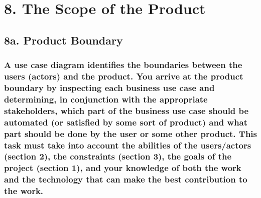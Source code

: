 \documentclass[
]{article}
\begin{document}
\hypertarget{the-scope-of-the-product}{%
\section{8. The Scope of the Product}\label{the-scope-of-the-product}}

\hypertarget{a.-product-boundary}{%
\subsection{8a. Product Boundary}\label{a.-product-boundary}}

\hypertarget{a-use-case-diagram-identifies-the-boundaries-between-the-users-actors-and-the-product.-you-arrive-at-the-product-boundary-by-inspecting-each-business-use-case-and-determining-in-conjunction-with-the-appropriate-stakeholders-which-part-of-the-business-use-case-should-be-automated-or-satisfied-by-some-sort-of-product-and-what-part-should-be-done-by-the-user-or-some-other-product.-this-task-must-take-into-account-the-abilities-of-the-usersactors-section-2-the-constraints-section-3-the-goals-of-the-project-section-1-and-your-knowledge-of-both-the-work-and-the-technology-that-can-make-the-best-contribution-to-the-work.}{%
\subsubsection{\texorpdfstring{A use case diagram identifies the
boundaries between the users (actors) and the product. You arrive at the
product boundary by inspecting each business use case and determining,
in conjunction with the appropriate stakeholders, which part of the
business use case should be automated (or satisfied by some sort of
product) and what part should be done by the user or some other product.
This task must take into account the abilities of the users/actors
(section 2), the constraints (section 3), the goals of the project
(section 1), and your knowledge of both the work and the technology that
can make the best contribution to the work.
}{A use case diagram identifies the boundaries between the users (actors) and the product. You arrive at the product boundary by inspecting each business use case and determining, in conjunction with the appropriate stakeholders, which part of the business use case should be automated (or satisfied by some sort of product) and what part should be done by the user or some other product. This task must take into account the abilities of the users/actors (section 2), the constraints (section 3), the goals of the project (section 1), and your knowledge of both the work and the technology that can make the best contribution to the work. }}\label{a-use-case-diagram-identifies-the-boundaries-between-the-users-actors-and-the-product.-you-arrive-at-the-product-boundary-by-inspecting-each-business-use-case-and-determining-in-conjunction-with-the-appropriate-stakeholders-which-part-of-the-business-use-case-should-be-automated-or-satisfied-by-some-sort-of-product-and-what-part-should-be-done-by-the-user-or-some-other-product.-this-task-must-take-into-account-the-abilities-of-the-usersactors-section-2-the-constraints-section-3-the-goals-of-the-project-section-1-and-your-knowledge-of-both-the-work-and-the-technology-that-can-make-the-best-contribution-to-the-work.}}
\end{document}

